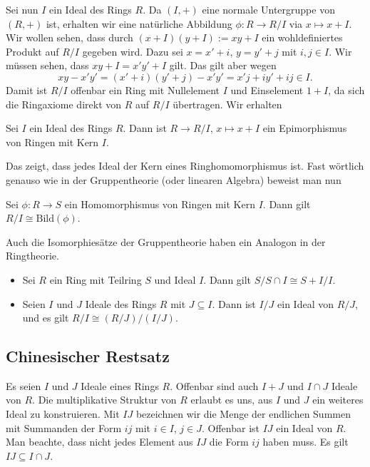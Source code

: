 \documentclass[12pt,a4paper,twoside]{article}
\begin{document}
Sei nun $I$ ein Ideal des Rings $R$. Da $(I,+)$ eine normale Untergruppe von
$(R,+)$ ist, erhalten wir eine nat\"urliche Abbildung $\phi:R\to R/I$ via
$x\mapsto x+I$. Wir wollen sehen, dass durch $(x+I)(y+I):=xy+I$ ein
wohldefiniertes Produkt auf $R/I$ gegeben wird. Dazu sei $x=x'+i$, $y=y'+j$
mit $i,j\in I$. Wir m\"ussen sehen, dass $xy+I=x'y'+I$ gilt. Das gilt aber
wegen
\[
xy-x'y'=(x'+i)(y'+j)-x'y'=x'j+iy'+ij\in I.
\]
Damit ist $R/I$ offenbar ein Ring mit Nullelement $I$ und Einselement $1+I$,
da sich die Ringaxiome direkt von $R$ auf $R/I$ \"ubertragen. Wir erhalten
\begin{Satz}
  Sei $I$ ein Ideal des Rings $R$. Dann ist $R\to R/I$, $x\mapsto x+I$ ein
  Epimorphismus von Ringen mit Kern $I$.
\end{Satz}
Das zeigt, dass jedes Ideal der Kern eines Ringhomomorphismus ist. Fast
w\"ortlich genauso wie in der Gruppentheorie (oder linearen Algebra) beweist
man nun
\begin{Satz}[Homomorphiesatz]
  Sei $\phi:R\to S$ ein Homomorphismus von Ringen mit Kern $I$. Dann gilt
  $R/I\cong \text{Bild}(\phi)$.
\end{Satz}
Auch die Isomorphies\"atze der Gruppentheorie haben ein Analogon in der
Ringtheorie.
\begin{Satz}
  \begin{itemize}
  \item[(a)] Sei $R$ ein Ring mit Teilring $S$ und Ideal $I$. Dann gilt
  $S/S\cap I\cong S+I/I$.
\item[(b)] Seien $I$ und $J$ Ideale des Rings $R$ mit $J\subseteq I$. Dann ist
  $I/J$ ein Ideal von $R/J$, und es gilt $R/I\cong (R/J)/(I/J)$.
  \end{itemize}
\end{Satz}
\subsection{Chinesischer Restsatz}
Es seien $I$ und $J$ Ideale eines Rings $R$. Offenbar sind auch $I+J$ und
$I\cap J$ Ideale von $R$. Die multiplikative Struktur von $R$ erlaubt es uns,
aus $I$ und $J$ ein weiteres Ideal zu konstruieren. Mit $IJ$ bezeichnen wir
die Menge der endlichen Summen mit Summanden der Form $ij$ mit $i\in I$, $j\in
J$. Offenbar ist $IJ$ ein Ideal von $R$. Man beachte, dass nicht jedes
Element aus $IJ$ die Form $ij$ haben muss. Es gilt $IJ\subseteq I\cap J$.
\end{document}
